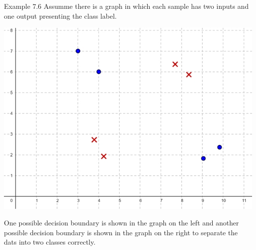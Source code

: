 \documentclass{book}
\begin{document}
\begin{egBox}{Example 7.6}{}
    Assumme there is a graph in which each sample has two inputs and one output presenting the class label.
        \begin{center}
            \includegraphics[scale=0.18]{chapter 7/ch7_figure24.jpeg}
        \end{center}
        One possible decision boundary is shown in the graph on the left and another possible decision boundary is shown in the graph on the right to separate the dats into two classes correctly.
        \begin{center}
            \begin{minipage}{0.5\textwidth}
\end{minipage}
\end{center}
\end{egBox}
\end{document}
